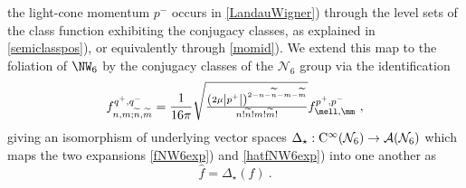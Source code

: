 the light-cone momentum $p^-$ occurs in \eqref{LandauWigner}) through
the level sets of the class function exhibiting the conjugacy classes,
as explained in \eqref{semiclasspos}), or equivalently through
\eqref{momid}). We extend this map to the foliation of $\NW_6$ by the
conjugacy classes of the $\mathcal{N}_6$ group via the identification
\begin{equation}
f_{n,m;\widetilde{n},\widetilde{m}}^{q^+,q^-}=
\frac1{16\pi} \sqrt{\mbox{$\frac{\left(2\mu \left|p^+\right|
\right)^{2-n-\widetilde{n}-m-\widetilde{m}}}{n! \widetilde{n}! m! 
\widetilde{m}!}$}} f_{\mell,\mm}^{p^+,p^-} \ ,
\label{fextid}\end{equation}
giving an isomorphism of underlying vector spaces
$\Delta_\star:{\rm
  C}^\infty(\mathcal{N}_6)\to\mathcal{A}(\mathcal{N}_6)$ which maps the
two expansions \eqref{fNW6exp}) and \eqref{hatfNW6exp}) into one another
as
\begin{equation}
\hat f = \Delta_\star(f) \ .
\label{DeltastarNW6}\end{equation}

